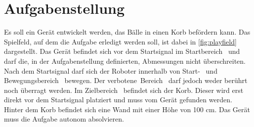 \section{Aufgabenstellung}
\label{sec:aufgabe}
Es soll ein Gerät entwickelt werden, das Bälle in einen Korb befördern kann.  
Das Spielfeld, auf dem die Aufgabe erledigt werden soll, ist dabei in 
\autoref{fig:playfield} dargestellt. Das Gerät befindet sich vor dem 
Startsignal im \mbox{Startbereich } und darf die, in der Aufgabenstellung definierten, Abmessungen 
nicht überschreiten. Nach dem Startsignal darf sich der Roboter innerhalb von 
\mbox{Start- } und 
\mbox{Bewegungsbereich } 
bewegen. Der \mbox{verbotene Bereich } darf jedoch weder berührt noch überragt werden. Im 
\mbox{Zielbereich } 
befindet sich der Korb. Dieser wird erst direkt vor dem Startsignal platziert 
und muss vom Gerät  gefunden werden. Hinter dem Korb befindet sich eine Wand 
mit einer Höhe von 100 cm. Das Gerät muss die Aufgabe autonom absolvieren. 
\cite{hslu:aufgabe}
